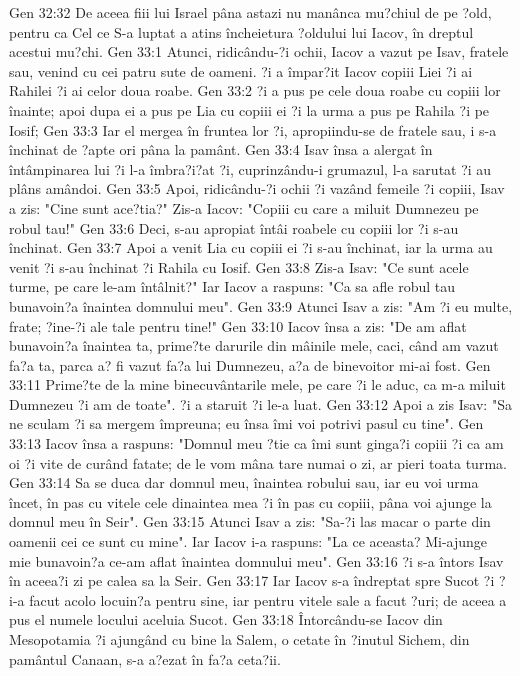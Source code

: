Gen 32:32  De aceea fiii lui Israel pâna astazi nu manânca mu?chiul de pe ?old, pentru ca Cel ce S-a luptat a atins încheietura ?oldului lui Iacov, în dreptul acestui mu?chi.
Gen 33:1  Atunci, ridicându-?i ochii, Iacov a vazut pe Isav, fratele sau, venind cu cei patru sute de oameni. ?i a împar?it Iacov copiii Liei ?i ai Rahilei ?i ai celor doua roabe.
Gen 33:2  ?i a pus pe cele doua roabe cu copiii lor înainte; apoi dupa ei a pus pe Lia cu copiii ei ?i la urma a pus pe Rahila ?i pe Iosif;
Gen 33:3  Iar el mergea în fruntea lor ?i, apropiindu-se de fratele sau, i s-a închinat de ?apte ori pâna la pamânt.
Gen 33:4  Isav însa a alergat în întâmpinarea lui ?i l-a îmbra?i?at ?i, cuprinzându-i grumazul, l-a sarutat ?i au plâns amândoi.
Gen 33:5  Apoi, ridicându-?i ochii ?i vazând femeile ?i copiii, Isav a zis: "Cine sunt ace?tia?" Zis-a Iacov: "Copiii cu care a miluit Dumnezeu pe robul tau!"
Gen 33:6  Deci, s-au apropiat întâi roabele cu copiii lor ?i s-au închinat.
Gen 33:7  Apoi a venit Lia cu copiii ei ?i s-au închinat, iar la urma au venit ?i s-au închinat ?i Rahila cu Iosif.
Gen 33:8  Zis-a Isav: "Ce sunt acele turme, pe care le-am întâlnit?" Iar Iacov a raspuns: "Ca sa afle robul tau bunavoin?a înaintea domnului meu".
Gen 33:9  Atunci Isav a zis: "Am ?i eu multe, frate; ?ine-?i ale tale pentru tine!"
Gen 33:10  Iacov însa a zis: "De am aflat bunavoin?a înaintea ta, prime?te darurile din mâinile mele, caci, când am vazut fa?a ta, parca a? fi vazut fa?a lui Dumnezeu, a?a de binevoitor mi-ai fost.
Gen 33:11  Prime?te de la mine binecuvântarile mele, pe care ?i le aduc, ca m-a miluit Dumnezeu ?i am de toate". ?i a staruit ?i le-a luat.
Gen 33:12  Apoi a zis Isav: "Sa ne sculam ?i sa mergem împreuna; eu însa îmi voi potrivi pasul cu tine".
Gen 33:13  Iacov însa a raspuns: "Domnul meu ?tie ca îmi sunt ginga?i copiii ?i ca am oi ?i vite de curând fatate; de le vom mâna tare numai o zi, ar pieri toata turma.
Gen 33:14  Sa se duca dar domnul meu, înaintea robului sau, iar eu voi urma încet, în pas cu vitele cele dinaintea mea ?i în pas cu copiii, pâna voi ajunge la domnul meu în Seir".
Gen 33:15  Atunci Isav a zis: "Sa-?i las macar o parte din oamenii cei ce sunt cu mine". Iar Iacov i-a raspuns: "La ce aceasta? Mi-ajunge mie bunavoin?a ce-am aflat înaintea domnului meu".
Gen 33:16  ?i s-a întors Isav în aceea?i zi pe calea sa la Seir.
Gen 33:17  Iar Iacov s-a îndreptat spre Sucot ?i ?i-a facut acolo locuin?a pentru sine, iar pentru vitele sale a facut ?uri; de aceea a pus el numele locului aceluia Sucot.
Gen 33:18  Întorcându-se Iacov din Mesopotamia ?i ajungând cu bine la Salem, o cetate în ?inutul Sichem, din pamântul Canaan, s-a a?ezat în fa?a ceta?ii.
